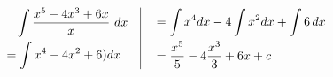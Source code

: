 \documentclass[17pt]{extarticle}
\begin{document}
\begin{fleqn}
\begin{equation} \nonumber
\begin{alignedat}{4}
& \quad \int \frac{x^5 - 4x^3 + 6x}{x}\ dx\\
&= \int x^4 - 4x^2 +6)dx\\
\end{alignedat}
\quad
\vrule
\quad
\begin{alignedat}{4}
&= \int x^4dx - 4\int x^2dx +\int 6\,dx\\
&= \frac{x^5}{5}-4\frac{x^3}{3}+6x +c
\end{alignedat}
\end{equation}
\quad


\end{fleqn}
\end{document}
